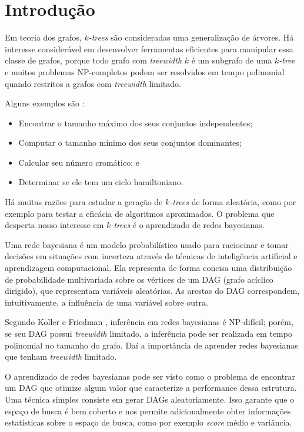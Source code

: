 \chapter{Introdução}
\label{cap:introducao}

Em teoria dos grafos, \emph{$k$-trees} são consideradas uma generalização de árvores. Há interesse considerável em desenvolver ferramentas eficientes para manipular essa classe de grafos, porque todo grafo com \emph{treewidth} $k$ é um subgrafo de uma \emph{$k$-tree} e muitos problemas NP-completos podem ser resolvidos em tempo polinomial quando restritos a grafos com \emph{treewidth} limitado.

Alguns exemplos são \cite{arnborg}:

\begin{itemize}
  \item Encontrar o tamanho máximo dos seus conjuntos independentes;
  \item Computar o tamanho mínimo dos seus conjuntos dominantes;
  \item Calcular seu número cromático; e
  \item Determinar se ele tem um ciclo hamiltoniano.
\end{itemize}

Há muitas razões para estudar a geração de \emph{$k$-trees} de forma aleatória, como por exemplo para testar a eficácia de algoritmos aproximados. O problema que desperta nosso interesse em \emph{$k$-trees} é o aprendizado de redes bayesianas.

Uma rede bayesiana é um modelo probabilístico usado para raciocinar e tomar decisões em situações com incerteza através de técnicas de inteligência artificial e aprendizagem computacional. Ela representa de forma concisa uma distribuição de probabilidade multivariada sobre os vértices de um DAG (grafo acíclico dirigido), que representam variáveis aleatórias. As arestas do DAG correspondem, intuitivamente, a influência de uma variável sobre outra.

Segundo Koller e Friedman \cite{koller}, inferência em redes bayesianas é NP-difícil; porém, se seu DAG possui \emph{treewidth} limitado, a inferência pode ser realizada em tempo polinomial no tamanho do grafo. Daí a importância de aprender redes bayesianas que tenham \emph{treewidth} limitado.

O aprendizado de redes bayesianas pode ser visto como o problema de encontrar um DAG que otimize algum valor que caracterize a performance dessa estrutura. Uma técnica simples consiste em gerar DAGs aleatoriamente. Isso garante que o espaço de busca é bem coberto e nos permite adicionalmente obter informações estatísticas sobre o espaço de busca, como por exemplo \emph{score} médio e variância.

